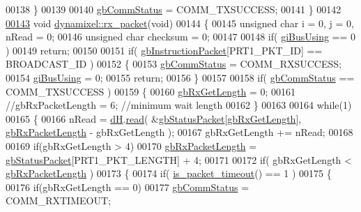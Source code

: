 \begin{DoxyCode}
00138     \}
00139 
00140     \hyperlink{a00003_a5b603f6bed7ccc595f1f50bd6a6ebbfc}{gbCommStatus} = COMM\_TXSUCCESS;
00141 \}
00142 
\hypertarget{a00012_source_l00143}{}\hyperlink{a00003_aa26d2d2dff768563a1cb1480aa061608}{00143} \textcolor{keywordtype}{void} \hyperlink{a00003_aa26d2d2dff768563a1cb1480aa061608}{dynamixel::rx\_packet}(\textcolor{keywordtype}{void})
00144 \{
00145     \textcolor{keywordtype}{unsigned} \textcolor{keywordtype}{char} i = 0, j = 0, nRead = 0;
00146     \textcolor{keywordtype}{unsigned} \textcolor{keywordtype}{char} checksum = 0;
00147 
00148     \textcolor{keywordflow}{if}( \hyperlink{a00003_ad10e0e49f5fef04bf789a89c14cc470a}{giBusUsing} == 0 )
00149         \textcolor{keywordflow}{return};
00150 
00151     \textcolor{keywordflow}{if}( \hyperlink{a00003_afd94dcf01b8e96298727776e222de722}{gbInstructionPacket}[PRT1\_PKT\_ID] == BROADCAST\_ID )
00152     \{
00153         \hyperlink{a00003_a5b603f6bed7ccc595f1f50bd6a6ebbfc}{gbCommStatus} = COMM\_RXSUCCESS;
00154         \hyperlink{a00003_ad10e0e49f5fef04bf789a89c14cc470a}{giBusUsing} = 0;
00155         \textcolor{keywordflow}{return};
00156     \}
00157     
00158     \textcolor{keywordflow}{if}( \hyperlink{a00003_a5b603f6bed7ccc595f1f50bd6a6ebbfc}{gbCommStatus} == COMM\_TXSUCCESS )
00159     \{
00160         \hyperlink{a00003_a9d590ce24791d111c2db9b66be1e046d}{gbRxGetLength} = 0;
00161         \textcolor{comment}{//gbRxPacketLength = 6; //minimum wait length}
00162     \}
00163     
00164     \textcolor{keywordflow}{while}(1)
00165     \{
00166         nRead = \hyperlink{a00003_ae003cc90ada6d7b70eaa4ea9d42d4deb}{dH}.\hyperlink{a00002_ac36331febb2eaa66303af3483795742a}{read}( &\hyperlink{a00003_aa57c86d3bbbeaf5c9d4f6bd00376b04f}{gbStatusPacket}[\hyperlink{a00003_a9d590ce24791d111c2db9b66be1e046d}{gbRxGetLength}], 
      \hyperlink{a00003_a333686e1b5903d16c41df8172b6bd5a8}{gbRxPacketLength} - gbRxGetLength );
00167         gbRxGetLength += nRead;
00168 
00169         \textcolor{keywordflow}{if}(gbRxGetLength > 4)
00170             \hyperlink{a00003_a333686e1b5903d16c41df8172b6bd5a8}{gbRxPacketLength} = \hyperlink{a00003_aa57c86d3bbbeaf5c9d4f6bd00376b04f}{gbStatusPacket}[PRT1\_PKT\_LENGTH] + 4;
00171 
00172         \textcolor{keywordflow}{if}( gbRxGetLength < \hyperlink{a00003_a333686e1b5903d16c41df8172b6bd5a8}{gbRxPacketLength} )
00173         \{
00174             \textcolor{keywordflow}{if}( \hyperlink{a00003_a00d08481ebc4dee19debecf43f888522}{is\_packet\_timeout}() == 1 )
00175             \{
00176                 \textcolor{keywordflow}{if}(gbRxGetLength == 0)
00177                     \hyperlink{a00003_a5b603f6bed7ccc595f1f50bd6a6ebbfc}{gbCommStatus} = COMM\_RXTIMEOUT;

\end{DoxyCode}
